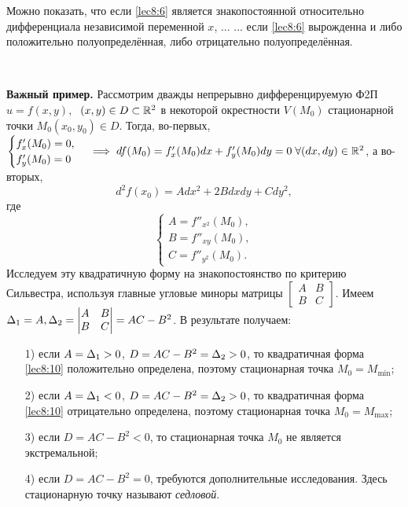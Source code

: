 \documentclass[../../main.tex]{subfiles}
\begin{document}
\begin{rem}
    Можно показать, что если \eqref{lec8:6} является знакопостоянной 
относительно дифференциала независимой переменной $x$, ...
... если \eqref{lec8:6} вырожденна и либо положительно 
полуопределённая, либо отрицательно полуопределённая.
\end{rem}

~

\noindent\textbf{Важный пример.}
Рассмотрим дважды непрерывно дифференцируемую Ф2П $u = f(x, y), \;$ $
(x, y) \in D \subset \mathbb{R}^2$ в некоторой окрестности $V(M_0)$ стационарной
точки $M_0 (x_0, y_0) \in D$. Тогда, во-первых, 
$\begin{cases}
f'_x(M_0) = 0, \\
f'_y(M_0) = 0
\end{cases} 
\implies df(M_0) = f'_x(M_0)dx + f'_y(M_0)dy = 0 \; \forall(dx, dy) 
\in \mathbb{R}^2$, а во-вторых, 
\begin{equation}
d^2f(x_0) = Adx^2 + 2Bdxdy + Cdy^2,
\label{lec8:10}
\end{equation}
где 
\[\begin{cases}
A = f''_{x^2}(M_0), \\
B = f''_{xy}(M_0), \\
C = f''_{y^2}(M_0).
\end{cases}\]
Исследуем эту квадратичную форму на знакопостоянство по критерию Сильвестра,
используя главные угловые миноры матрицы 
$\begin{bmatrix}
A & B \\
B & C
\end{bmatrix}$. Имеем $\Delta_1 = A, \Delta_2 = 
\begin{vmatrix}
A & B \\
B & C
\end{vmatrix} = AC - B^2$. В результате получаем:
\begin{itemize}
\item[1)] если $A = \Delta_1 > 0$, $D = AC-B^2 = \Delta_2 > 0$, то квадратичная форма
\eqref{lec8:10} положительно определена, поэтому стационарная точка 
$M_0 = M_{\min}$;
\item[2)] если $A = \Delta_1 < 0$, $D = AC-B^2 = \Delta_2 > 0$, то квадратичная форма
\eqref{lec8:10} отрицательно определена, поэтому стационарная точка 
$M_0 = M_{\max}$;
\item[3)] если $D = AC - B^2 < 0$, то стационарная точка $M_0$ не является
экстремальной;
\item[4)] если $D = AC - B^2 = 0$, требуются дополнительные исследования. Здесь
стационарную точку называют \emph{седловой}.
\end{itemize}
\end{document}
